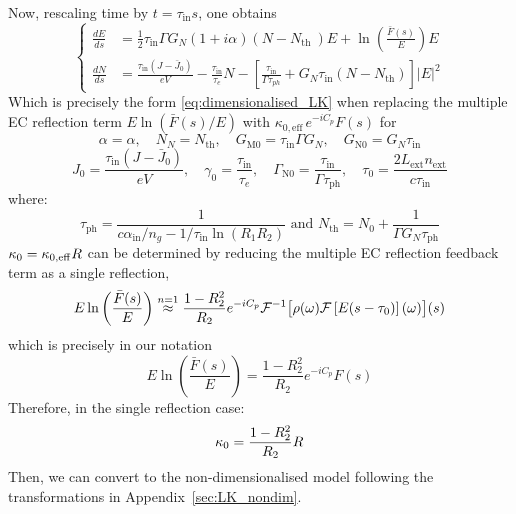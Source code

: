 %
Now, rescaling time by $t=\tau_\text{in} s$, one obtains
%
\begin{equation*}
\left\{\begin{aligned}
\frac{d E}{d s} &= \frac{1}{2} \tau_\text{in} \Gamma G_N(1+i \alpha)\left(N-N_{\text {th }}\right) E + \ln \left(\frac{\bar{F}(s)}{E}\right) E
\\
\frac{d N}{d s} &= \frac{\tau_{\text{in}}\left(J-\bar{J}_0\right)}{e V}-\frac{\tau_\text{in}}{\tau_e} N-\left[\frac{\tau_\text{in}}{\Gamma \tau_{ph}}+G_N \tau_\text{in}\left(N-N_{\text{th}}\right)\right]|E|^2
\end{aligned}\right.
\end{equation*}
%
Which is precisely the form \eqref{eq:dimensionalised_LK} when replacing the multiple EC reflection term $E \ln \left( \bar{F}(s) / E \right)$ with $\kappa_{0,\mathrm{eff}} \, e^{-i C_p} F(s)$ for
%
\[ \alpha = \alpha , \quad N_N = N_{\text{th}}, \quad G_\text{M0} = \tau_\text{in} \Gamma G_N, \quad G_\text{N0} = G_N \tau_\text{in} 
\]
\[
J_0 = \frac{\tau_\text{in}(J-\bar{J}_0)}{e V}, \quad \gamma_0 = \frac{\tau_\text{in}}{\tau_e}, \quad \Gamma_\text{N0} = \frac{\tau_\text{in}}{\Gamma \tau_\text{ph}}, \quad \tau_0 = \frac{2 L_\text{ext} n_\text{ext}}{c \tau_\text{in}} 
\]
%
where:
%
\begin{equation*}
\tau_\text{ph}=\frac{1}{c \alpha_\text{in} / n_g - 1 / \tau_\text{in} \ln \left(R_1 R_2\right)} \text{ and } N_{\text{th}} = N_0+\frac{1}{\Gamma G_N \tau_\text{ph}} 
\end{equation*}
%
$\kappa_0 = \kappa_{0,\mathrm{eff}} R$ can be determined by reducing the multiple EC reflection feedback term as a single reflection,
%
\begin{equation*}
E \ln \left( \frac{\bar{F}(s)}{E} \right) \overset{n=1}{\approx} \frac{1-R_2^2}{R_2}e^{-iC_p} \mathcal{F}^{-1}\big[ \rho(\omega) \mathcal{F}\left[ E(s-\tau_0) \right](\omega) \big](s)
\end{equation*}
%
which is precisely in our notation
%
\begin{equation*}
E \ln \left(\frac{\bar{F}(s)}{E}\right)=\frac{1-R_2^2}{R_2} e^{-i C_p} F(s)
\end{equation*}
%
Therefore, in the single reflection case:
%
\begin{equation*}
    \kappa_0=\frac{1-R_2^2}{R_2} R
\end{equation*}
%
Then, we can convert to the non-dimensionalised model following the transformations in Appendix~\ref{sec:LK_nondim}.
%
%
